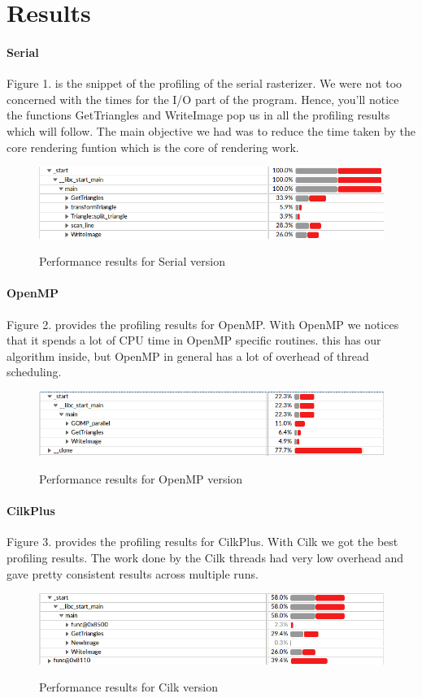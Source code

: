 \chapter*{Results}

\subsubsection*{Serial}
Figure 1. is the snippet of the profiling of the serial rasterizer. We were not too concerned with the times for the I/O part of the program. Hence, you'll notice the functions GetTriangles and WriteImage pop us in all the profiling results which will follow. The main objective we had was to reduce the time taken by the core rendering funtion which is the core of rendering work.

\begin{figure}
\includegraphics[width=1\textwidth]{./pictures/serial.png}
\label{serpro}
\caption{Performance results for Serial version}
\end{figure}

\subsubsection*{OpenMP}
Figure 2. provides the profiling results for OpenMP. With OpenMP we notices that it spends a lot of CPU time in OpenMP specific routines. this has our algorithm inside, but  OpenMP in general has a lot of overhead of thread scheduling.
\begin{figure}
\includegraphics[width=1\textwidth]{./pictures/omp.png}
\label{omppro}
\caption{Performance results for OpenMP version}
\end{figure}

\subsubsection*{CilkPlus}
Figure 3. provides the profiling results for CilkPlus. With Cilk we got the best profiling results. The work done by the Cilk threads had very low overhead and gave pretty consistent results across multiple runs.
\begin{figure}
\includegraphics[width=1\textwidth]{./pictures/cilk.png}
\label{clkpro}
\caption{Performance results for Cilk version}
\end{figure}

